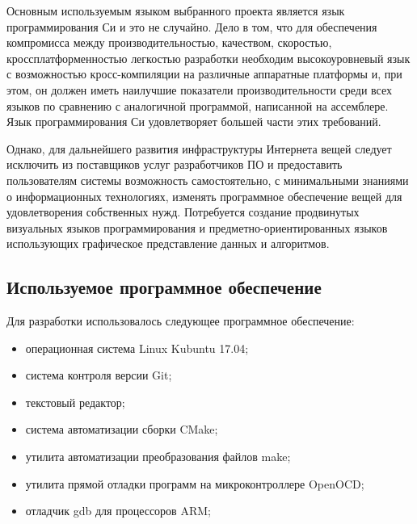 

Основным используемым языком выбранного проекта является язык программирования 
Си и это не случайно.
Дело в том, что для обеспечения компромисса между производительностью, 
качеством, скоростью, кроссплатформенностью легкостью разработки необходим 
высокоуровневый язык с возможностью кросс-компиляции на различные аппаратные 
платформы и, при этом, он должен иметь наилучшие показатели производительности 
среди всех языков по сравнению с аналогичной программой, написанной на 
ассемблере.
Язык программирования Си удовлетворяет большей части этих требований. 

Однако, для дальнейшего развития инфраструктуры Интернета вещей следует 
исключить из поставщиков услуг разработчиков ПО и предоставить пользователям 
системы возможность самостоятельно, с минимальными знаниями о информационных 
технологиях, изменять программное обеспечение вещей для удовлетворения 
собственных нужд.
Потребуется создание продвинутых визуальных языков программирования и 
предметно-ориентированных языков использующих графическое
представление данных и алгоритмов. 

\subsection{Используемое программное обеспечение}

Для разработки использовалось следующее программное обеспечение:
\begin{itemize}
 \item операционная система Linux Kubuntu 17.04;
 \item система контроля версии Git;
 \item текстовый редактор;
 \item система автоматизации сборки CMake;
 \item утилита автоматизации преобразования файлов make;
 \item утилита прямой отладки программ на микроконтроллере OpenOCD;
 \item отладчик gdb для процессоров ARM;
\end{itemize}


